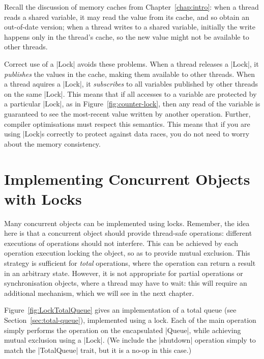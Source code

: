
Recall the discussion of memory caches from Chapter~\ref{chap:intro}: when a
thread reads a shared variable, it may read the value from its cache, and so
obtain an out-of-date version; when a thread writes to a shared variable,
initially the write happens only in the thread's cache, so the new value might
not be available to other threads.

Correct use of a |Lock| avoids these problems.  When a thread releases a
|Lock|, it \emph{publishes} the values in the cache, making them available to
other threads.  When a thread aquires a |Lock|, it \emph{subscribes} to all
variables published by other threads on the same |Lock|.  This means that if
all accesses to a variable are protected by a particular |Lock|, as in
Figure~\ref{fig:counter-lock}, then any read of the variable is guaranteed to
see the most-recent value written by another operation.  Further, compiler
optimisations must respect this semantics.  This means that if you are using
|Lock|s correctly to protect against data races, you do not need to worry
about the memory consistency.


\section{Implementing Concurrent Objects with Locks}

Many concurrent objects can be implemented using locks.  Remember, the idea
here is that a concurrent object should provide thread-safe operations:
different executions of operations should not interfere.  This can be achieved
by each operation execution locking the object, so as to provide mutual
exclusion.  This strategy is sufficient for \emph{total}  operations, where
the operation can return a result in an arbitrary state.  However, it is not
appropriate for partial operations or synchronisation objects, where a thread
may have to wait: this will require an additional mechanism, which we will see
in the next chapter.

Figure~\ref{fig:LockTotalQueue} gives an implementation of a total queue (see
Section~\ref{sec:total-queue}), implemented using a lock.  Each of the main
operation simply performs the operation on the encapsulated |Queue|, while
achieving mutual exclusion using a |Lock|.  (We include the |shutdown|
operation simply to match the |TotalQueue| trait, but it is a no-op in this
case.) 

